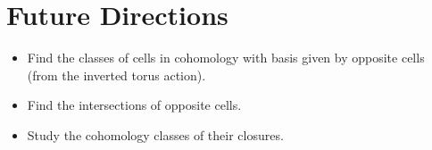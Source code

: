 \documentclass{amsart}
\newtheorem{lemma}[theorem]{Lemma}
\numberwithin{equation}{section}
\newcommand{\bfe}{\mathbf{e}}
\newcommand{\bff}{\mathbf{f}}
\newcommand{\bfg}{\mathbf{g}}
\newcommand{\Hom}{\operatorname{Hom}}
\begin{document}


\section{Future Directions}
  \begin{itemize}
    \item Find the classes of cells in cohomology with basis given by opposite cells (from the inverted torus action).
    \item Find the intersections of opposite cells.
    \item Study the cohomology classes of their closures.
  \end{itemize}
\end{document}
